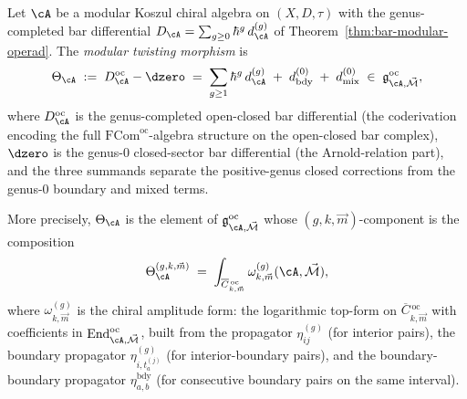 \begin{definition}
\label{def:modular-twisting-morphism-oc}
Let $\cA$ be a modular Koszul chiral algebra on $(X, D, \tau)$
with the genus-completed bar differential
$D_\cA = \sum_{g \geq 0} \hbar^g\, d_\cA^{(g)}$ of
Theorem~\ref{thm:bar-modular-operad}.  The
\emph{modular twisting morphism} is
\begin{equation}\label{eq:theta-oc}
\Theta_\cA
\;:=\;
D_\cA^{\mathrm{oc}} - \dzero
\;=\;
\sum_{g \geq 1} \hbar^g\, d_\cA^{(g)}
\;+\;
d_{\mathrm{bdy}}^{(0)}
\;+\;
d_{\mathrm{mix}}^{(0)}
\;\in\;
\mathfrak{g}^{\mathrm{oc}}_{\cA, \vec{\mathcal{M}}},
\end{equation}
where $D_\cA^{\mathrm{oc}}$ is the genus-completed open-closed
bar differential (the coderivation encoding the full
$\mathrm{FCom}^{\mathrm{oc}}$-algebra structure on the
open-closed bar complex), $\dzero$ is the genus-$0$ closed-sector
bar differential (the Arnold-relation part), and the three
summands separate the positive-genus closed corrections from the
genus-$0$ boundary and mixed terms.

More precisely, $\Theta_\cA$ is the element of
$\mathfrak{g}^{\mathrm{oc}}_{\cA, \vec{\mathcal{M}}}$ whose
$(g, k, \vec{m})$-component is the composition
\begin{equation}\label{eq:theta-components}
\Theta_\cA^{(g, k, \vec{m})}
\;=\;
\int_{\overline{C}{}^{\,\mathrm{oc}}_{k,\vec{m}}}
\omega^{(g)}_{k, \vec{m}}(\cA, \vec{\mathcal{M}}),
\end{equation}
where $\omega^{(g)}_{k, \vec{m}}$ is the chiral amplitude form:
the logarithmic top-form on
$\overline{C}{}^{\,\mathrm{oc}}_{k,\vec{m}}$ with
coefficients in
$\operatorname{End}^{\mathrm{oc}}_{\cA, \vec{\mathcal{M}}}$,
built from the propagator $\eta^{(g)}_{ij}$ (for interior pairs),
the boundary propagator $\eta^{(g)}_{i, t_a^{(j)}}$ (for
interior-boundary pairs), and the boundary-boundary propagator
$\eta^{\mathrm{bdy}}_{a,b}$ (for consecutive boundary pairs on
the same interval).
\end{definition}

